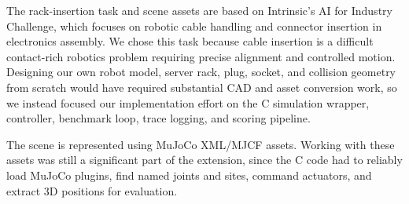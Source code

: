 \documentclass[11pt]{article}
\begin{document}
The rack-insertion task and scene assets are based on Intrinsic's AI for Industry Challenge, which focuses on robotic cable handling and connector insertion in electronics assembly. We chose this task because cable insertion is a difficult contact-rich robotics problem requiring precise alignment and controlled motion. Designing our own robot model, server rack, plug, socket, and collision geometry from scratch would have required substantial CAD and asset conversion work, so we instead focused our implementation effort on the C simulation wrapper, controller, benchmark loop, trace logging, and scoring pipeline.

The scene is represented using MuJoCo XML/MJCF assets. Working with these assets was still a significant part of the extension, since the C code had to reliably load MuJoCo plugins, find named joints and sites, command actuators, and extract 3D positions for evaluation.
\end{document}
